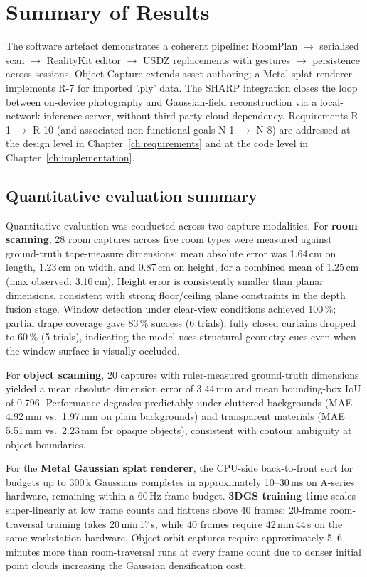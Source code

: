 \section{Summary of Results}

The software artefact demonstrates a coherent pipeline: RoomPlan $\rightarrow$ serialised scan $\rightarrow$ RealityKit editor $\rightarrow$ USDZ replacements with gestures $\rightarrow$ persistence across sessions. Object Capture extends asset authoring; a Metal splat renderer implements R-7 for imported '.ply' data. The SHARP integration closes the loop between on-device photography and Gaussian-field reconstruction via a local-network inference server, without third-party cloud dependency. Requirements R-1 $\rightarrow$ R-10 (and associated non-functional goals N-1 $\rightarrow$ N-8) are addressed at the design level in Chapter~\ref{ch:requirements} and at the code level in Chapter~\ref{ch:implementation}.

\subsection{Quantitative evaluation summary}

Quantitative evaluation was conducted across two capture modalities. For \textbf{room scanning}, 28 room captures across five room types were measured against ground-truth tape-measure dimensions: mean absolute error was 1.64\,cm on length, 1.23\,cm on width, and 0.87\,cm on height, for a combined mean of 1.25\,cm (max observed: 3.10\,cm). Height error is consistently smaller than planar dimensions, consistent with strong floor/ceiling plane constraints in the depth fusion stage. Window detection under clear-view conditions achieved 100\,\%; partial drape coverage gave 83\,\% success (6 trials); fully closed curtains dropped to 60\,\% (5 trials), indicating the model uses structural geometry cues even when the window surface is visually occluded.

For \textbf{object scanning}, 20 captures with ruler-measured ground-truth dimensions yielded a mean absolute dimension error of 3.44\,mm and mean bounding-box IoU of 0.796. Performance degrades predictably under cluttered backgrounds (MAE 4.92\,mm vs.\ 1.97\,mm on plain backgrounds) and transparent materials (MAE 5.51\,mm vs.\ 2.23\,mm for opaque objects), consistent with contour ambiguity at object boundaries.

For the \textbf{Metal Gaussian splat renderer}, the CPU-side back-to-front sort for budgets up to 300\,k Gaussians completes in approximately 10--30\,ms on A-series hardware, remaining within a 60\,Hz frame budget. \textbf{3DGS training time} scales super-linearly at low frame counts and flattens above 40 frames: 20-frame room-traversal training takes 20\,min\,17\,s, while 40 frames require 42\,min\,44\,s on the same workstation hardware. Object-orbit captures require approximately 5--6\,minutes more than room-traversal runs at every frame count due to denser initial point clouds increasing the Gaussian densification cost.

